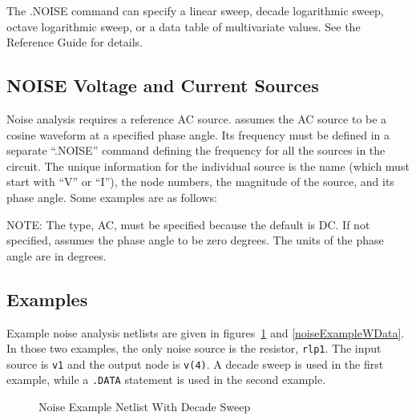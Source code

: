 The .NOISE command can specify a linear sweep, decade logarithmic
sweep, octave logarithmic sweep, or a data table of multivariate
values. See the \Xyce{} Reference Guide\ReferenceGuide{} for details.

\subsection{NOISE Voltage and Current Sources}
\label{NOISE_Sources}

Noise analysis requires a reference AC source.  \Xyce{} assumes the AC
source to be a cosine waveform at a specified phase angle. Its
frequency must be defined in a separate ``.NOISE'' command defining
the frequency for all the sources in the circuit. The unique
information for the individual source is the name (which must start
with ``V'' or ``I''), the node numbers, the magnitude of the source,
and its phase angle. Some examples are as follows:


NOTE: The type, AC, must be specified because the default is DC. If
not specified, \Xyce{} assumes the phase angle to be zero degrees.
The units of the phase angle are in degrees.

\subsection{Examples}

Example noise analysis netlists are given in
figures~\ref{noiseExample} and \ref{noiseExampleWData}.  In those two
examples, the only noise source is the resistor, \texttt{rlp1}.  The
input source is \texttt{v1} and the output node is \texttt{v(4)}.  A
decade sweep is used in the first example, while a \texttt{.DATA}
statement is used in the second example.
\begin{figure}[htbp]
  \begin{centering}
\caption[Noise Example Netlist With Decade Sweep]
{Noise Example Netlist With Decade Sweep\label{noiseExample} }
\end{centering}
\end{figure}

